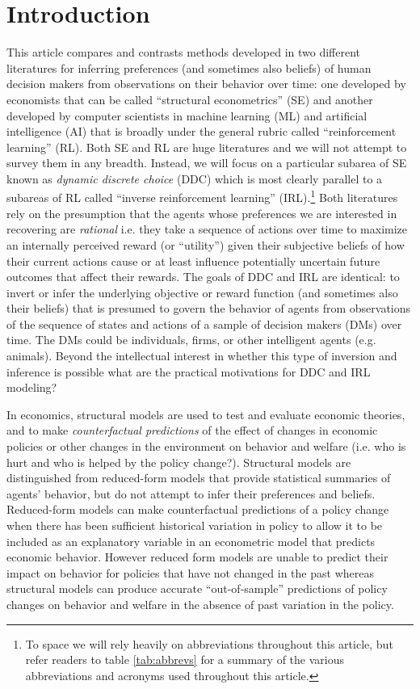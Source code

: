 

\section{Introduction\label{sec:introduction}}

This article compares and contrasts  methods developed in two different
literatures for inferring preferences (and sometimes also beliefs) of human decision makers 
from observations on their behavior over time: one developed by economists
that can be called ``structural econometrics'' (SE) and another developed by computer scientists 
in machine learning (ML) and artificial intelligence (AI) that is broadly under the general 
rubric called ``reinforcement learning'' (RL). Both SE and RL are huge literatures
and we will not attempt to survey them in any breadth. Instead, we will focus on a particular
subarea of SE known as {\it dynamic discrete choice\/} (DDC) which is most clearly
parallel to a subareas of RL called ``inverse reinforcement learning'' (IRL).\footnote{\footnotesize To space we will rely heavily
on abbreviations throughout this article, but refer readers to table \ref{tab:abbrevs} for a summary
of the various abbreviations and acronyms used throughout this article.}
Both literatures rely on the presumption that the agents whose preferences we are interested in recovering
are {\it rational\/} i.e. they take a sequence
of actions over time to maximize an internally perceived reward (or ``utility'') given their subjective beliefs of how
their current actions cause or at least influence potentially uncertain future outcomes that affect their rewards. The 
goals of DDC and IRL are identical:  to invert or infer the underlying objective or reward function (and sometimes also their beliefs) that is presumed to govern the behavior of agents 
from observations of the sequence of  states and actions of a sample of decision makers (DMs) over time.
The DMs could be  individuals, firms, or other intelligent agents (e.g. animals).
Beyond the intellectual interest in whether this type of inversion and inference is possible
what are the practical motivations for DDC and  IRL modeling?   

In economics, structural models are used to test and evaluate economic theories, and to make {\it counterfactual predictions\/} 
of the effect of changes in
economic policies or other changes in the environment on behavior and welfare 
(i.e. who is hurt and who is helped by the policy change?). Structural models are distinguished
from reduced-form models that provide statistical summaries of agents' behavior, but do not attempt to
infer their preferences and beliefs. Reduced-form models can make counterfactual predictions of a policy change when there
has been sufficient historical variation in policy to allow it to be included as an explanatory variable in 
an econometric model that predicts economic behavior. However reduced form models are unable to predict their impact on behavior for policies that have not changed in the past whereas 
structural models can produce accurate ``out-of-sample''
predictions of policy changes on behavior and welfare in the absence of past variation in the policy. 

